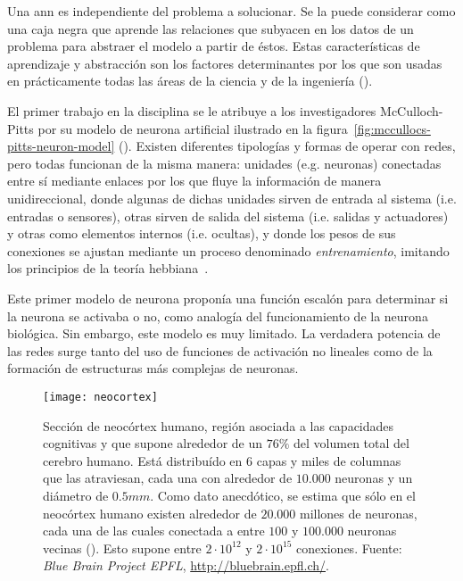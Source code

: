 Una \Acrfull{ann} es independiente del problema a solucionar. Se la puede considerar como una caja negra que aprende las relaciones que subyacen en los datos de un problema para abstraer el modelo a partir de éstos. Estas características de aprendizaje y abstracción son los factores determinantes por los que son usadas en prácticamente todas las áreas de la ciencia y de la ingeniería (\cite{Du2006}).

El primer trabajo en la disciplina se le atribuye a  los investigadores McCulloch-Pitts por su modelo de neurona artificial ilustrado en la figura~\ref{fig:mccullocs-pitts-neuron-model} (\cite{McCulloch1943}). Existen diferentes tipologías y formas de operar con redes, pero todas funcionan de la misma manera: unidades (e.g. neuronas) conectadas entre sí mediante enlaces por los que fluye la información de manera unidireccional, donde algunas de dichas unidades sirven de entrada al sistema (i.e. entradas o sensores), otras sirven de salida del sistema (i.e. salidas y actuadores) y otras como elementos internos (i.e. ocultas), y donde los pesos de sus conexiones se ajustan mediante un proceso denominado \textit{entrenamiento}, imitando los principios de la teoría hebbiana~\cite{hebb19680}.

Este primer modelo de neurona proponía una función escalón para determinar si la neurona se activaba o no, como analogía del funcionamiento de la neurona biológica. Sin embargo, este modelo es muy limitado. La verdadera potencia de las redes surge tanto del uso de funciones de activación no lineales como de la formación de estructuras más complejas de neuronas.

\begin{figure}[t]
	\centering
	\texttt{[image: neocortex]}
	\caption[Sección de neocórtex humano]{Sección de neocórtex humano, región asociada a las capacidades cognitivas y que supone alrededor de un $76\%$ del volumen total del cerebro humano. Está distribuído en $6$ capas y miles de columnas que las atraviesan, cada una con alrededor de $10.000$ neuronas y un diámetro de $0.5mm$.  Como dato anecdótico, se estima que sólo en el neocórtex humano existen alrededor de $20.000$ millones de neuronas, cada una de las cuales conectada a entre $100$ y $100.000$ neuronas vecinas (\cite{Pakkenberg1997}). Esto supone entre $2 \cdot 10^{12}$ y $2 \cdot 10^{15}$ conexiones. Fuente: \textit{Blue Brain Project EPFL}, \url{http://bluebrain.epfl.ch/}.}
	\label{fig:neocortex}
\end{figure}

